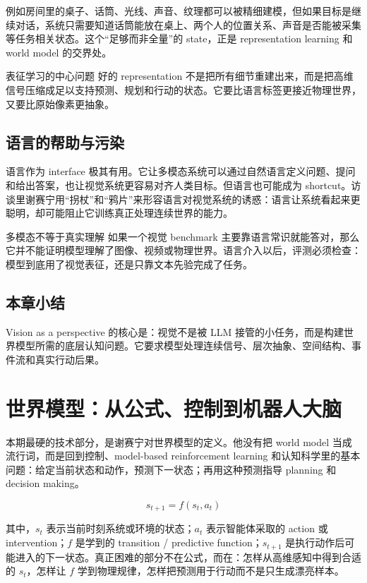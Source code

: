 \documentclass[a4paper]{article}
\begin{document}
例如房间里的桌子、话筒、光线、声音、纹理都可以被精细建模，但如果目标是继续对话，系统只需要知道话筒能放在桌上、两个人的位置关系、声音是否能被采集等任务相关状态。这个“足够而非全量”的 state，正是 representation learning 和 world model 的交界处。

\begin{importantbox}{表征学习的中心问题}
好的 representation 不是把所有细节重建出来，而是把高维信号压缩成足以支持预测、规划和行动的状态。它要比语言标签更接近物理世界，又要比原始像素更抽象。
\end{importantbox}

\subsection{语言的帮助与污染}

语言作为 interface 极其有用。它让多模态系统可以通过自然语言定义问题、提问和给出答案，也让视觉系统更容易对齐人类目标。但语言也可能成为 shortcut。访谈里谢赛宁用“拐杖”和“鸦片”来形容语言对视觉系统的诱惑：语言让系统看起来更聪明，却可能阻止它训练真正处理连续世界的能力。

\begin{warningbox}{多模态不等于真实理解}
如果一个视觉 benchmark 主要靠语言常识就能答对，那么它并不能证明模型理解了图像、视频或物理世界。语言介入以后，评测必须检查：模型到底用了视觉表征，还是只靠文本先验完成了任务。
\end{warningbox}

\subsection{本章小结}

Vision as a perspective 的核心是：视觉不是被 LLM 接管的小任务，而是构建世界模型所需的底层认知问题。它要求模型处理连续信号、层次抽象、空间结构、事件流和真实行动后果。

\section{世界模型：从公式、控制到机器人大脑}

本期最硬的技术部分，是谢赛宁对世界模型的定义。他没有把 world model 当成流行词，而是回到控制、model-based reinforcement learning 和认知科学里的基本问题：给定当前状态和动作，预测下一状态；再用这种预测指导 planning 和 decision making。

\[
s_{t+1} = f(s_t, a_t)
\]

其中，$s_t$ 表示当前时刻系统或环境的状态；$a_t$ 表示智能体采取的 action 或 intervention；$f$ 是学到的 transition / predictive function；$s_{t+1}$ 是执行动作后可能进入的下一状态。真正困难的部分不在公式，而在：怎样从高维感知中得到合适的 $s_t$，怎样让 $f$ 学到物理规律，怎样把预测用于行动而不是只生成漂亮样本。
\end{document}
